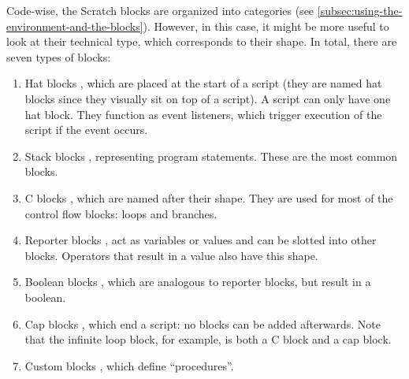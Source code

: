 \documentclass[../main]{subfiles}
\begin{document}
Code-wise, the Scratch blocks are organized into categories (see \cref{subsec:using-the-environment-and-the-blocks}).
However, in this case, it might be more useful to look at their technical type, which corresponds to their shape.
In total, there are seven types of blocks:

\begin{enumerate}
    \item Hat blocks \scratchinline{\blockinit{\hspace{1em}\dots\hspace*{1em}}}, which are placed at the start of a script (they are named hat blocks since they visually sit on top of a script).
        A script can only have one hat block.
        They function as event listeners, which trigger execution of the script if the event occurs.
    \item Stack blocks \scratchinline{\blockmove{\hspace{1em}\dots\hspace*{0.5cm}}}, representing program statements.
        These are the most common blocks.
    \item C blocks \scratchinline{\blockif{\hspace{1em}\dots\hspace*{1em}}{\blockspace[0.2]}}, which are named after their shape.
        They are used for most of the control flow blocks: loops and branches.
    \item Reporter blocks \ovalmove{\hspace{1em}\dots\hspace*{1em}}, act as variables or values and can be slotted into other blocks.
        Operators that result in a value also have this shape.
    \item Boolean blocks \boolsensing{\hspace{1em}\dots\hspace*{1em}}, which are analogous to reporter blocks, but result in a boolean.
    \item Cap blocks \scratchinline{\blockstop{\hspace{1em}\dots\hspace*{1em}}}, which end a script: no blocks can be added afterwards.
        Note that the infinite loop block, for example, is both a C block and a cap block.
    \item Custom blocks , which define ``procedures''.
\end{enumerate}
\end{document}
